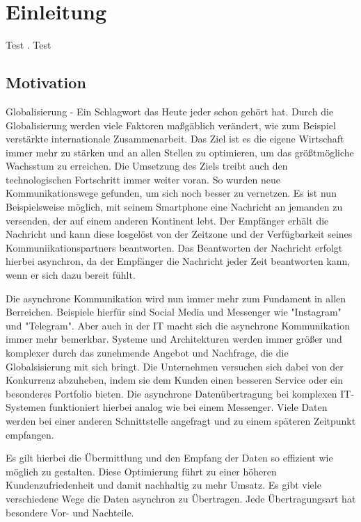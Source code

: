 \chapter{Einleitung}
\label{ch:intro}
Test \citep{dueck:trio}. Test

%
%
\section{Motivation}
\label{sec:intro:motivation}
Globalisierung - Ein Schlagwort das Heute jeder schon gehört hat. Durch die Globalisierung werden viele Faktoren maßgäblich verändert, wie zum Beispiel verstärkte internationale Zusammenarbeit. 
Das Ziel ist es die eigene Wirtschaft immer mehr zu stärken und an allen Stellen zu optimieren, um das größtmögliche Wachsstum zu erreichen. Die Umsetzung des Ziels treibt auch den technologischen Fortschritt immer weiter voran. So wurden neue Kommunikationswege gefunden, um sich noch besser zu vernetzen.
Es ist nun Beispielsweise möglich, mit seinem Smartphone eine Nachricht an jemanden zu versenden, der auf einem anderen Kontinent lebt. Der Empfänger erhält die Nachricht und kann diese losgelöst von der Zeitzone und der Verfügbarkeit seines Kommuniikationspartners beantworten. 
Das Beantworten der Nachricht erfolgt hierbei asynchron, da der Empfänger die Nachricht jeder Zeit beantworten kann, wenn er sich dazu bereit fühlt.


Die asynchrone Kommunikation wird nun immer mehr zum Fundament in allen Berreichen. Beispiele hierfür sind Social Media und Messenger wie "Instagram" und "Telegram". Aber auch in der IT macht sich die asynchrone Kommunikation immer mehr bemerkbar. 
Systeme und Architekturen werden immer größer und komplexer durch das zunehmende Angebot und Nachfrage, die die Globalsisierung mit sich bringt. Die Unternehmen versuchen sich dabei von der Konkurrenz abzuheben, indem sie dem Kunden einen besseren Service oder ein besonderes Portfolio bieten. 
Die asynchrone Datenübertragung bei komplexen IT-Systemen funktioniert hierbei analog wie bei einem Messenger. Viele Daten werden bei einer anderen Schnittstelle angefragt und zu einem späteren Zeitpunkt empfangen.


Es gilt hierbei die Übermittlung und den Empfang der Daten so effizient wie möglich zu gestalten.
Diese Optimierung führt zu einer höheren Kundenzufriedenheit und damit nachhaltig zu mehr Umsatz.
Es gibt viele verschiedene Wege die Daten asynchron zu Übertragen. Jede Übertragungsart hat besondere Vor- und Nachteile.


